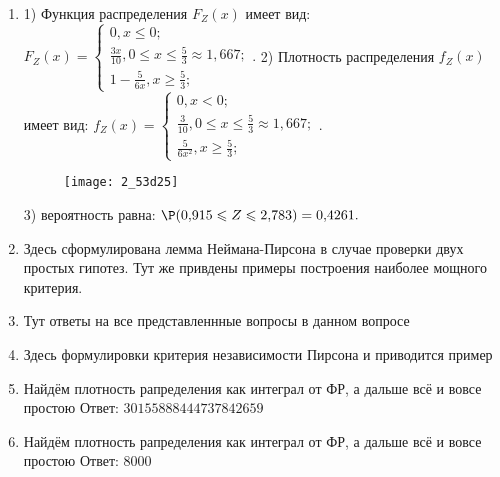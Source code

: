 \documentclass[a4paper,12pt]{article}
\begin{document}
\begin{enumerate}
\item


1) Функция распределения $F_Z(x)$ имеет вид:
$
F_Z(x)=\left\{
\begin{array}{l}
0, x\leqslant 0;\\
\frac{3 x}{10}, 0\leqslant x\leqslant \frac{5}{3}\approx 1,\!667;\\
1 - \frac{5}{6 x}, x\geqslant\frac{5}{3};
\end{array}.
\right.
$
2) Плотность распределения $f_Z(x)$ имеет вид:
$
f_Z(x)=\left\{
\begin{array}{l}
0, x<0;\\
\frac{3}{10}, 0\leqslant x\leqslant \frac{5}{3}\approx 1,\!667;\\
\frac{5}{6 x^{2}}, x\geqslant\frac{5}{3};
\end{array}.
\right.
$


\begin{figure}[H]
    \texttt{[image: 2\_53d25]}
\end{figure}


3) вероятность равна:
$
\P(0,\!915\leqslant Z\leqslant 2,\!783)=
0,\!4261.
$



\item


Здесь сформулирована лемма Неймана-Пирсона в случае проверки двух простых гипотез. Тут же привдены
примеры построения наиболее мощного критерия.



\item


Тут ответы на все представленнные вопросы в данном вопросе



\item


Здесь формулировки критерия независимости Пирсона и приводится пример



\item


Найдём плотность рапределения как интеграл от ФР, а дальше всё и вовсе простою Ответ: $30155888444737842659$



\item


Найдём плотность рапределения как интеграл от ФР, а дальше всё и вовсе простою Ответ: $8000$




\end{enumerate}
\end{document}
